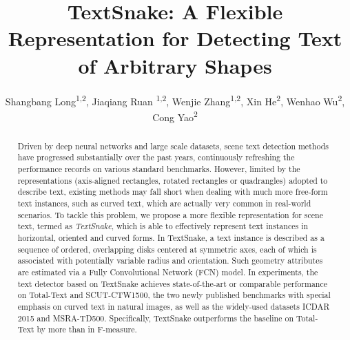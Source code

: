 \documentclass[runningheads]{llncs}
\begin{document}
\pagestyle{headings}
\mainmatter


\title{TextSnake: A Flexible Representation for Detecting Text of Arbitrary Shapes} 





\author{Shangbang Long\textsuperscript{1,2}, Jiaqiang Ruan \textsuperscript{1,2}, Wenjie Zhang\textsuperscript{1,2}, Xin He\textsuperscript{2}, Wenhao Wu\textsuperscript{2}, Cong Yao\textsuperscript{2}}






\maketitle

\begin{abstract}
Driven by deep neural networks and large scale datasets, scene text detection methods have progressed substantially over the past years, continuously refreshing the performance records on various standard benchmarks. However, limited by the representations (axis-aligned rectangles, rotated rectangles or quadrangles) adopted to describe text, existing methods may fall short when dealing with much more free-form text instances, such as curved text, which are actually very common in real-world scenarios. To tackle this problem, we propose a more flexible representation for scene text, termed as \textit{TextSnake}, which is able to effectively represent text instances in horizontal, oriented and curved forms. In TextSnake, a text instance is described as a sequence of ordered, overlapping disks centered at symmetric axes, each of which is associated with potentially variable radius and orientation. Such geometry attributes are estimated via a Fully Convolutional Network (FCN) model. In experiments, the text detector based on TextSnake achieves state-of-the-art or comparable performance on Total-Text and SCUT-CTW1500, the two newly published benchmarks with special emphasis on curved text in natural images, as well as the widely-used datasets ICDAR 2015 and MSRA-TD500. Specifically, TextSnake outperforms the baseline on Total-Text by more than \textit{} in F-measure.

\end{abstract}
\end{document}

